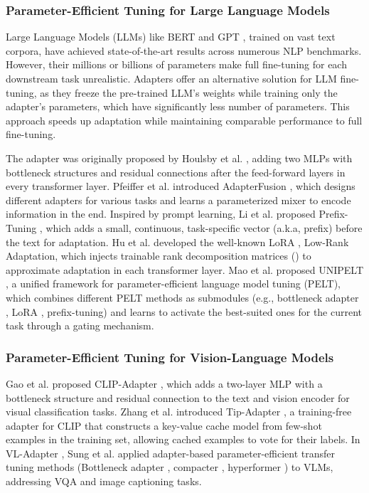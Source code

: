 \documentclass[journal]{IEEEtran}
\begin{document}
\subsubsection{Parameter-Efficient Tuning for Large Language Models}

Large Language Models (LLMs) like BERT \cite{bert} and GPT \cite{gpt}, trained on vast text corpora, have achieved state-of-the-art results across numerous NLP benchmarks. However, their millions or billions of parameters make full fine-tuning for each downstream task unrealistic. Adapters offer an alternative solution for LLM fine-tuning, as they freeze the pre-trained LLM's weights while training only the adapter's parameters, which have significantly less number of parameters. This approach speeds up adaptation while maintaining comparable performance to full fine-tuning. 

The adapter was originally proposed by Houlsby et al. \cite{houlsby2019parameterefficient}, adding two MLPs with bottleneck structures and residual connections after the feed-forward layers in every transformer layer. Pfeiffer et al. introduced AdapterFusion \cite{pfeiffer2021adapterfusion}, which designs different adapters for various tasks and learns a parameterized mixer to encode information in the end. Inspired by prompt learning, Li et al. proposed Prefix-Tuning \cite{li2021prefixtuning}, which adds a small, continuous, task-specific vector (a.k.a, prefix) before the text for adaptation. Hu et al. developed the well-known LoRA \cite{hu2021lora}, Low-Rank Adaptation, which injects trainable rank decomposition matrices () to approximate adaptation in each transformer layer. Mao et al. proposed UNIPELT \cite{unipelt}, a unified framework for parameter-efficient language model tuning (PELT), which combines different PELT methods as submodules (e.g., bottleneck adapter \cite{houlsby2019parameterefficient}, LoRA \cite{hu2021lora}, prefix-tuning\cite{li2021prefixtuning}) and learns to activate the best-suited ones for the current task through a gating mechanism.


\subsubsection{Parameter-Efficient Tuning for Vision-Language Models}
Gao et al. proposed CLIP-Adapter \cite{clipadapter}, which adds a two-layer MLP with a bottleneck structure and residual connection to the text and vision encoder for visual classification tasks. Zhang et al. introduced Tip-Adapter \cite{tipadapter}, a training-free adapter for CLIP that constructs a key-value cache model from few-shot examples in the training set, allowing cached examples to vote for their labels. In VL-Adapter \cite{vladapter}, Sung et al. applied adapter-based parameter-efficient transfer tuning methods (Bottleneck adapter \cite{houlsby2019parameterefficient}, compacter \cite{compacter}, hyperformer \cite{hyperformer}) to VLMs, addressing VQA and image captioning tasks.
\end{document}
